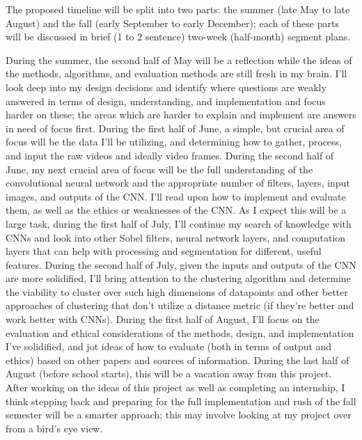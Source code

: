 \documentclass[10pt,twocolumn]{article}
\begin{document}
The proposed timeline will be split into two parts: the summer (late May to late August) and the fall (early September to early December); each of these parts will be discussed in brief (1 to 2 sentence) two-week (half-month) segment plans.

During the summer, the second half of May will be a reflection while the ideas of the methods, algorithms, and evaluation methods are still fresh in my brain. I'll look deep into my design decisions and identify where questions are weakly answered in terms of design, understanding, and implementation and focus harder on these; the areas which are harder to explain and implement are answers in need of focus first. During the first half of June, a simple, but crucial area of focus will be the data I'll be utilizing, and determining how to gather, process, and input the raw videos and ideally video frames. During the second half of June, my next crucial area of focus will be the full understanding of the convolutional neural network and the appropriate number of filters, layers, input images, and outputs of the CNN. I'll read upon how to implement and evaluate them, as well as the ethics or weaknesses of the CNN. As I expect this will be a large task, during the first half of July, I'll continue my search of knowledge with CNNs and look into other Sobel filters, neural network layers, and computation layers that can help with processing and segmentation for different, useful features. During the second half of July, given the inputs and outputs of the CNN are more solidified, I'll bring attention to the clustering algorithm and determine the viability to cluster over such high dimensions of datapoints and other better approaches of clustering that don't utilize a distance metric (if they're better and work better with CNNs). During the first half of August, I'll focus on the evaluation and ethical considerations of the methods, design, and implementation I've solidified, and jot ideas of how to evaluate (both in terms of output and ethics) based on other papers and sources of information. During the last half of August (before school starts), this will be a vacation away from this project. After working on the ideas of this project as well as completing an internship, I think stepping back and preparing for the full implementation and rush of the fall semester will be a smarter approach; this may involve looking at my project over from a bird's eye view. 

\end{document}

